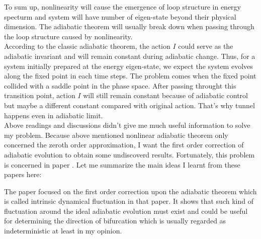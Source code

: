 \documentclass[fontsize=11pt, %
                             paper=a4, %
                             twoside, %
                             captions=tableheading,
                             index=totoc,
                             hyperref]{labbook}
\begin{document}
\begin{addmargin}[4cm]{0cm}
To sum up, nonlinearity will cause the emergence of loop structure in energy specturm and system will have number of eigen-state beyond their physical dimension. The adiabatic theorem will usually break down when passing through the loop structure caused by nonlinearity. \\
According to the classic adiabatic theorem, the action $I$ could serve as the adiabatic invariant and will remain constant during adiabatic change. Thus, for a system initially prepared at the energy eigen-state, we expect the system evolves along the fixed point in each time steps. The problem comes when the fixed point collided with a saddle point in the phase space. After passing throught this transition point, action $I$ will still remain constant because of adiabatic control but maybe a different constant compared with original action. That's why tunnel happens even in adiabatic limit.\\

Above readings and discussions didn't give me much useful information to solve my problem. Because above mentioned nonlinear adiabatic theorem only concerned the zeroth order approximation, I want the first order correction of adiabatic evolution to obtain some undiscoverd results. Fortunately, this problem is concerned in paper \cite{PhysRevLett.110.130402, 1367-2630-16-12-123024, 1751-8121-45-29-295302, Zhang20121202}. Let me summarize the main ideas I learnt from these papers here:

The paper \cite{PhysRevLett.110.130402} focused on the first order correction upon the adiabatic theorem which is called intrinsic dynamical fluctuation in that paper. It shows that such kind of fluctuation around the ideal adiabatic evolution must exist and could be useful for determining the direction of bifurcation which is usually regarded as indeterministic at least in my opinion. \\


\end{addmargin}
\end{document}
